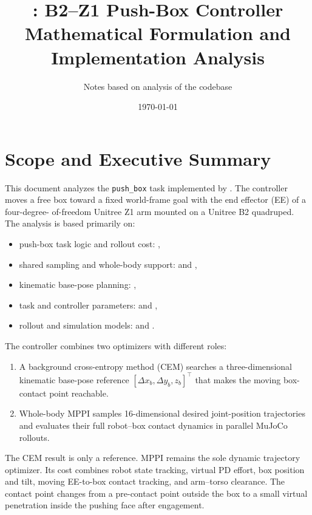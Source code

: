 \documentclass[11pt,a4paper]{article}
\title{\code{legged\_mani}: B2--Z1 Push-Box Controller\\
Mathematical Formulation and Implementation Analysis}
\author{Notes based on analysis of the \code{legged\_mani} codebase}
\date{\today}
\newcommand{\code}[1]{\texttt{#1}}
\begin{document}
\maketitle
\tableofcontents
\newpage

\section{Scope and Executive Summary}

This document analyzes the \code{push\_box} task implemented by
. The controller moves a free box
toward a fixed world-frame goal with the end effector (EE) of a four-degree-
of-freedom Unitree Z1 arm mounted on a Unitree B2 quadruped. The analysis is
based primarily on:
\begin{itemize}
  \item push-box task logic and rollout cost:
        ,
  \item shared sampling and whole-body support:
         and
        ,
  \item kinematic base-pose planning:
        ,
  \item task and controller parameters:
         and ,
  \item rollout and simulation models:
         and
        .
\end{itemize}

The controller combines two optimizers with different roles:
\begin{enumerate}
  \item A background cross-entropy method (CEM) searches a three-dimensional
        kinematic base-pose reference
        $[\Delta x_b,\Delta y_b,z_b]^\top$ that makes the moving box-contact
        point reachable.
  \item Whole-body MPPI samples 16-dimensional desired joint-position
        trajectories and evaluates their full robot--box contact dynamics in
        parallel MuJoCo rollouts.
\end{enumerate}
The CEM result is only a reference. MPPI remains the sole dynamic trajectory
optimizer. Its cost combines robot state tracking, virtual PD effort, box
position and tilt, moving EE-to-box contact tracking, and arm--torso
clearance. The contact point changes from a pre-contact point outside the box
to a small virtual penetration inside the pushing face after engagement.
\end{document}
